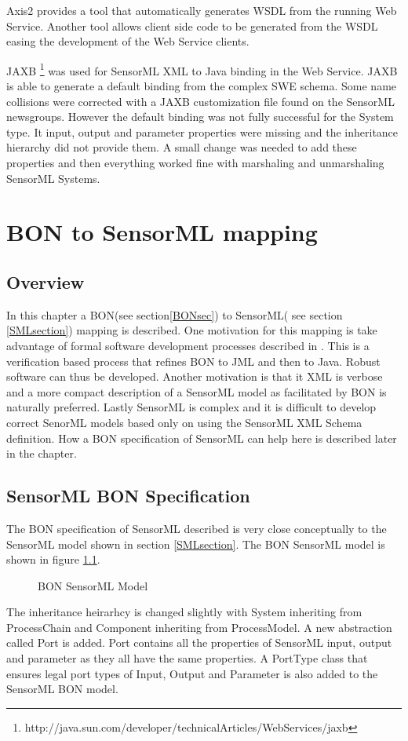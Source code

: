 \documentclass[]{final_report}
\begin{document}
Axis2 provides a tool that automatically generates WSDL from the running Web Service. Another tool allows client side code to be generated from the WSDL easing the development of the Web Service clients.

JAXB \footnote{http://java.sun.com/developer/technicalArticles/WebServices/jaxb} was used for SensorML XML to Java binding in the Web Service. JAXB is able to generate a default binding from the complex SWE schema. Some name collisions were corrected with a JAXB customization file found on the SensorML newsgroups. However the default binding was not fully successful for the System type. It input, output and parameter properties were missing and the inheritance hierarchy did not provide them. A small change was needed to add these properties and then everything worked fine with marshaling and unmarshaling SensorML Systems. 

\chapter{BON to SensorML mapping}
\section{Overview}
In this chapter a BON(see section\ref{BONsec}) to SensorML( see section \ref{SMLsection}) mapping is described. One motivation for this mapping is take advantage of formal software development processes described in \cite{Kiniryref}. This is a verification based process that refines BON to JML and then to Java. Robust software can thus be developed. Another motivation is that it XML is verbose and a more compact description of a SensorML model as facilitated by BON is naturally preferred. Lastly SensorML is complex and it is difficult to develop correct SenorML models based only on using the SensorML XML Schema definition. How a BON specification of SensorML can help here is described later in the chapter.

\section{SensorML BON Specification}
The BON specification of SensorML described is very close conceptually to the SensorML model shown in section \ref{SMLsection}.  The BON SensorML model is shown in figure \ref{fig:bonSensoMLModel}. 
\begin{figure}[h]
\centering
{}
\caption{BON SensorML Model}\label{fig:bonSensoMLModel}
\end{figure}
The inheritance heirarhcy is changed slightly with System inheriting from ProcessChain and Component inheriting from ProcessModel. A new abstraction called Port is added. Port contains all the properties of SensorML input, output and parameter as they all have the same properties. A PortType class that ensures legal port types of Input, Output and Parameter is also added to the SensorML BON model.
\end{document}
